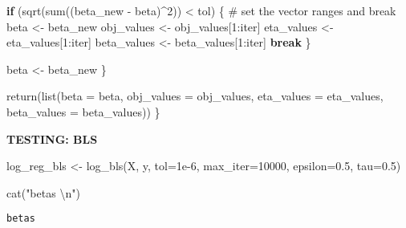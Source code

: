 \documentclass[
  letterpaper,
  DIV=11,
  numbers=noendperiod]{scrartcl}
\newenvironment{Shaded}{\begin{snugshade}}{\end{snugshade}}
\newcommand{\AttributeTok}[1]{\textcolor[rgb]{0.40,0.45,0.13}{#1}}
\newcommand{\CommentTok}[1]{\textcolor[rgb]{0.37,0.37,0.37}{#1}}
\newcommand{\ControlFlowTok}[1]{\textcolor[rgb]{0.00,0.23,0.31}{\textbf{#1}}}
\newcommand{\DecValTok}[1]{\textcolor[rgb]{0.68,0.00,0.00}{#1}}
\newcommand{\FloatTok}[1]{\textcolor[rgb]{0.68,0.00,0.00}{#1}}
\newcommand{\FunctionTok}[1]{\textcolor[rgb]{0.28,0.35,0.67}{#1}}
\newcommand{\NormalTok}[1]{\textcolor[rgb]{0.00,0.23,0.31}{#1}}
\newcommand{\OtherTok}[1]{\textcolor[rgb]{0.00,0.23,0.31}{#1}}
\newcommand{\SpecialCharTok}[1]{\textcolor[rgb]{0.37,0.37,0.37}{#1}}
\newcommand{\StringTok}[1]{\textcolor[rgb]{0.13,0.47,0.30}{#1}}
\begin{document}
\begin{Shaded}
\begin{Highlighting}[]
    \ControlFlowTok{if}\NormalTok{ (}\FunctionTok{sqrt}\NormalTok{(}\FunctionTok{sum}\NormalTok{((beta\_new }\SpecialCharTok{{-}}\NormalTok{ beta)}\SpecialCharTok{\^{}}\DecValTok{2}\NormalTok{)) }\SpecialCharTok{\textless{}}\NormalTok{ tol) \{}
      \CommentTok{\# set the vector ranges and break}
\NormalTok{      beta }\OtherTok{\textless{}{-}}\NormalTok{ beta\_new}
\NormalTok{      obj\_values }\OtherTok{\textless{}{-}}\NormalTok{ obj\_values[}\DecValTok{1}\SpecialCharTok{:}\NormalTok{iter]}
\NormalTok{      eta\_values }\OtherTok{\textless{}{-}}\NormalTok{ eta\_values[}\DecValTok{1}\SpecialCharTok{:}\NormalTok{iter]}
\NormalTok{      beta\_values }\OtherTok{\textless{}{-}}\NormalTok{ beta\_values[}\DecValTok{1}\SpecialCharTok{:}\NormalTok{iter]}
      \ControlFlowTok{break}
\NormalTok{    \}}
    
\NormalTok{    beta }\OtherTok{\textless{}{-}}\NormalTok{ beta\_new}
\NormalTok{  \}}
  
  \FunctionTok{return}\NormalTok{(}\FunctionTok{list}\NormalTok{(}\AttributeTok{beta =}\NormalTok{ beta, }\AttributeTok{obj\_values =}\NormalTok{ obj\_values, }\AttributeTok{eta\_values =}\NormalTok{ eta\_values, }\AttributeTok{beta\_values =}\NormalTok{ beta\_values))}
\NormalTok{\}}
\end{Highlighting}
\end{Shaded}

\textbf{TESTING: BLS}

\begin{Shaded}
\begin{Highlighting}[]
\NormalTok{log\_reg\_bls }\OtherTok{\textless{}{-}} \FunctionTok{log\_bls}\NormalTok{(X, y, }\AttributeTok{tol=}\FloatTok{1e{-}6}\NormalTok{, }\AttributeTok{max\_iter=}\DecValTok{10000}\NormalTok{, }\AttributeTok{epsilon=}\FloatTok{0.5}\NormalTok{, }\AttributeTok{tau=}\FloatTok{0.5}\NormalTok{)}
\end{Highlighting}
\end{Shaded}

\begin{Shaded}
\begin{Highlighting}[]
\FunctionTok{cat}\NormalTok{(}\StringTok{"betas }\SpecialCharTok{\textbackslash{}n}\StringTok{"}\NormalTok{)}
\end{Highlighting}
\end{Shaded}

\begin{verbatim}
betas 
\end{verbatim}

\begin{Shaded}
\end{Shaded}
\end{document}
